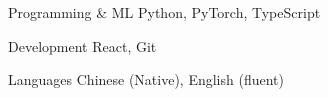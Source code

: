 
\begin{cvskills}

  \cvskill
    {Programming \& ML}
    {Python, PyTorch, TypeScript}

  \cvskill
    {Development}
    {React, Git}

  \cvskill
    {Languages}
    {Chinese (Native), English (fluent)}

\end{cvskills}